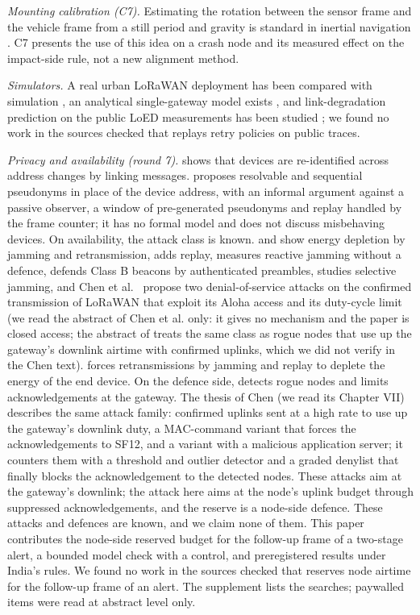 \documentclass{ieeeaccess}
\begin{document}
\emph{Mounting calibration (C7).} Estimating the rotation between the sensor frame and the vehicle frame from a still period and gravity is standard in inertial navigation \cite{Liu2022_isprs,Jameian2021_rsn}. C7 presents the use of this idea on a crash node and its measured effect on the impact-side rule, not a new alignment method.

\emph{Simulators.} A real urban LoRaWAN deployment has been compared with simulation \cite{Citoni2022_jsen2022}, an analytical single-gateway model exists \cite{Magrin2022_twc20213}, and link-degradation prediction on the public LoED measurements has been studied \cite{Karaglle2026_jtit2026}; we found no work in the sources checked that replays retry policies on public traces.

\emph{Privacy and availability (round 7).} \cite{R7Pelissier2022} shows that devices are re-identified across address changes by linking messages. \cite{R7Pelissier2024} proposes resolvable and sequential pseudonyms in place of the device address, with an informal argument against a passive observer, a window of pre-generated pseudonyms and replay handled by the frame counter; it has no formal model and does not discuss misbehaving devices. On availability, the attack class is known. \cite{R7Mikhaylov2019} and \cite{R7Nafees2020} show energy depletion by jamming and retransmission, \cite{R7EdaLora2026} adds replay, \cite{R7Dossa2025} measures reactive jamming without a defence, \cite{R7Suciu2019} defends Class B beacons by authenticated preambles, \cite{R7BlindSpot2025} studies selective jamming, and Chen et al.~\cite{R7MacDos2023} propose two denial-of-service attacks on the confirmed transmission of LoRaWAN that exploit its Aloha access and its duty-cycle limit (we read the abstract of Chen et al. only: it gives no mechanism and the paper is closed access; the abstract of \cite{Kumar2026_siml} treats the same class as rogue nodes that use up the gateway's downlink airtime with confirmed uplinks, which we did not verify in the Chen text). \cite{R7EdaLora2026} forces retransmissions by jamming and replay to deplete the energy of the end device. On the defence side, \cite{Kumar2026_siml} detects rogue nodes and limits acknowledgements at the gateway. The thesis of Chen \cite{ChenThesis2024} (we read its Chapter VII) describes the same attack family: confirmed uplinks sent at a high rate to use up the gateway's downlink duty, a MAC-command variant that forces the acknowledgements to SF12, and a variant with a malicious application server; it counters them with a threshold and outlier detector and a graded denylist that finally blocks the acknowledgement to the detected nodes. These attacks aim at the gateway's downlink; the attack here aims at the node's uplink budget through suppressed acknowledgements, and the reserve is a node-side defence. These attacks and defences are known, and we claim none of them. This paper contributes the node-side reserved budget for the follow-up frame of a two-stage alert, a bounded model check with a control, and preregistered results under India's rules. We found no work in the sources checked that reserves node airtime for the follow-up frame of an alert. The supplement lists the searches; paywalled items were read at abstract level only.
\end{document}
